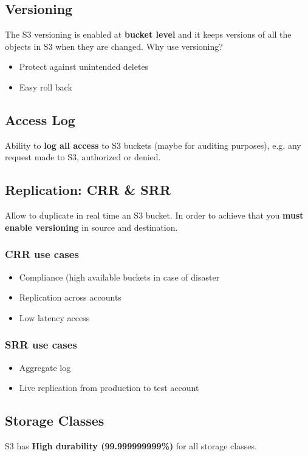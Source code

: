 \subsection{Versioning}
The S3 versioning is enabled at \textbf{bucket level} and it keeps versions of all the objects in S3 when they are changed.
Why use versioning?
\begin{itemize}
	\item{Protect against unintended deletes}
	\item{Easy roll back}
\end{itemize}

\subsection{Access Log}
Ability to \textbf{log all access} to S3 buckets (maybe for auditing purposes), e.g. any request made to S3, authorized or denied.

\subsection{Replication: CRR \& SRR}
Allow to duplicate in real time an S3 bucket. In order to achieve that you \textbf{must enable versioning} in source and destination.
\subsubsection{CRR use cases}
\begin{itemize}
	\item{Compliance (high available buckets in case of disaster}
	\item{Replication across accounts}
	\item{Low latency access}
\end{itemize}
\subsubsection{SRR use cases}
\begin{itemize}
	\item{Aggregate log}
	\item{Live replication from production to test account}
\end{itemize}

\subsection{Storage Classes}
S3 has \textbf{High durability (99.999999999\%)} for all storage classes.

